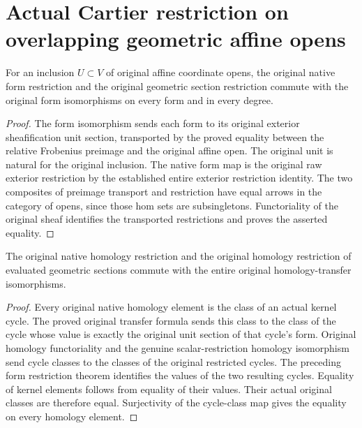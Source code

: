 \section{Actual Cartier restriction on overlapping geometric affine opens}

\begin{lemma}
\label{lem:cartier-geometric-form-iso-restriction}
\leanok
{}
For an inclusion $U\subset V$ of original affine coordinate opens,
the original native form restriction and the original geometric
section restriction commute with the original form isomorphisms
on every form and in every degree.
\end{lemma}
\begin{proof}
The form isomorphism sends each form to its original exterior
sheafification unit section, transported by the proved equality
between the relative Frobenius preimage and the original affine
open. The original unit is natural for the original inclusion.
The native form map is the original raw exterior restriction by
the established entire exterior restriction identity. The two
composites of preimage transport and restriction have equal
arrows in the category of opens, since those hom sets are
subsingletons. Functoriality of the original sheaf identifies
the transported restrictions and proves the asserted equality.
\end{proof}

\begin{theorem}
\label{thm:cartier-geometric-homology-transfer-restriction}
\leanok
{}
The original native homology restriction and the original homology
restriction of evaluated geometric sections commute with the
entire original homology-transfer isomorphisms.
\end{theorem}
\begin{proof}
Every original native homology element is the class of an actual
kernel cycle. The proved original transfer formula sends this
class to the class of the cycle whose value is exactly the
original unit section of that cycle's form. Original homology
functoriality and the genuine scalar-restriction homology
isomorphism send cycle classes to the classes of the original
restricted cycles. The preceding form restriction theorem
identifies the values of the two resulting cycles. Equality of
kernel elements follows from equality of their values. Their
actual original classes are therefore equal. Surjectivity of
the cycle-class map gives the equality on every homology element.
\end{proof}

